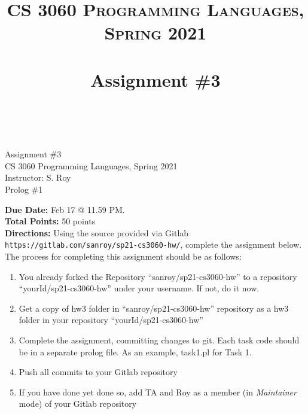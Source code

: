 \documentclass[paper=letter, fontsize=11pt]{scrartcl} %
\title{ 
    \normalfont \normalsize 
    \textsc{CS 3060 Programming Languages, Spring 2021} \\ [25pt] %
    \horrule{0.5pt} \\[0.4cm] %
    \huge Assignment \#3  \\ %
    \horrule{2pt} \\[0.5cm] %
}
\begin{document}
    \begin{center}
         Assignment \#3\\
        \small CS 3060 Programming Languages, Spring 2021 \\
        \small Instructor: S. Roy \\
        \huge Prolog \#1
    \end{center}
    
    \textbf{Due Date:} Feb 17 @ 11.59 PM. \\
    \textbf{Total Points:} 50 points \\

    \textbf{Directions:} Using the source provided via Gitlab \@ \texttt{https://gitlab.com/sanroy/sp21-cs3060-hw/},
complete the assignment below. The process for completing this assignment should be as follows:

    \begin{enumerate}[noitemsep]
        \item You already forked the Repository ``sanroy/sp21-cs3060-hw'' to a repository ``yourId/sp21-cs3060-hw'' under your username. If not, do it now.
        \item Get a copy of hw3 folder in ``sanroy/sp21-cs3060-hw'' repository as a hw3 folder in your repository ``yourId/sp21-cs3060-hw''
        \item Complete the assignment, committing changes to git. Each task code should be in a separate prolog file. As an example, task1.pl for Task 1.
        \item Push all commits to your Gitlab repository
        \item If you have done yet done so, add TA and Roy as a member (in \emph{Maintainer} mode) of your Gitlab repository
    \end{enumerate}
\end{document}

